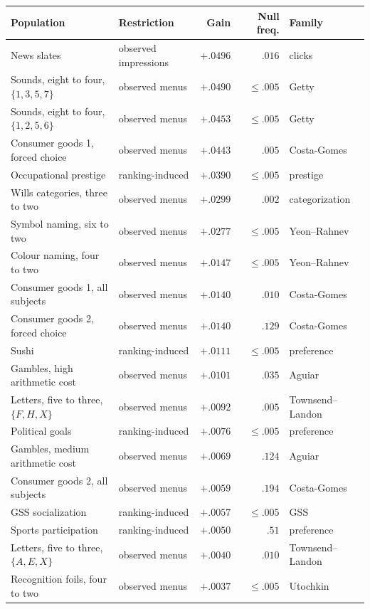 \documentclass[11pt]{article}
\theoremstyle{italichead}
\begin{document}
\begin{table}[!tbp]
\centering
\small
\begin{tabular}{llrrl}
\toprule
Population & Restriction & Gain & Null freq. & Family \\
\midrule
News slates & observed impressions & $+.0496$ & $.016$\footnotemark[2] & clicks \\
Sounds, eight to four, $\{1,3,5,7\}$ & observed menus & $+.0490$ & $\le .005$ & Getty \\
Sounds, eight to four, $\{1,2,5,6\}$ & observed menus & $+.0453$ & $\le .005$ & Getty \\
Consumer goods 1, forced choice & observed menus & $+.0443$ & $.005$ & Costa-Gomes \\
Occupational prestige & ranking-induced & $+.0390$ & $\le .005$ & prestige \\
Wills categories, three to two & observed menus & $+.0299$ & $.002$ & categorization \\
Symbol naming, six to two & observed menus & $+.0277$ & $\le .005$ & Yeon--Rahnev \\
Colour naming, four to two & observed menus & $+.0147$ & $\le .005$ & Yeon--Rahnev \\
Consumer goods 1, all subjects & observed menus & $+.0140$ & $.010$ & Costa-Gomes \\
Consumer goods 2, forced choice & observed menus & $+.0140$ & $.129$ & Costa-Gomes \\
Sushi & ranking-induced & $+.0111$ & $\le .005$ & preference \\
Gambles, high arithmetic cost & observed menus & $+.0101$ & $.035$ & Aguiar \\
Letters, five to three, $\{F,H,X\}$ & observed menus & $+.0092$ & $.005$ & Townsend--Landon \\
Political goals & ranking-induced & $+.0076$ & $\le .005$ & preference \\
Gambles, medium arithmetic cost & observed menus & $+.0069$ & $.124$ & Aguiar \\
Consumer goods 2, all subjects & observed menus & $+.0059$ & $.194$ & Costa-Gomes \\
GSS socialization & ranking-induced & $+.0057$ & $\le .005$ & GSS \\
Sports participation & ranking-induced & $+.0050$ & $.51$ & preference \\
Letters, five to three, $\{A,E,X\}$ & observed menus & $+.0040$ & $.010$ & Townsend--Landon \\
Recognition foils, four to two & observed menus & $+.0037$ & $\le .005$ & Utochkin \\

\end{tabular}
\end{table}
\end{document}
